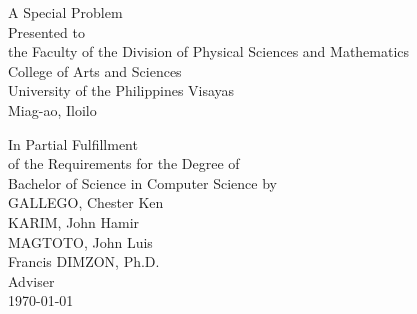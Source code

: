 \begin{titlepage}
\centering


\vspace{0.875cm}
A Special Problem\\
Presented to\\
the Faculty of the Division of Physical Sciences and Mathematics\\
College of Arts and Sciences\\
University of the Philippines Visayas\\
Miag-ao, Iloilo

\vspace{0.875cm}
In Partial Fulfillment\\
of the Requirements for the Degree of\\
Bachelor of Science in Computer Science
\vspace{1.75cm}
by\\

\vspace{0.1cm}
GALLEGO, Chester Ken  \\
KARIM, John Hamir  \\
MAGTOTO, John Luis  \\

\vspace{0.875cm}
Francis DIMZON, Ph.D. \\
Adviser\\


\vspace{0.875cm}
\today
\end{titlepage}
